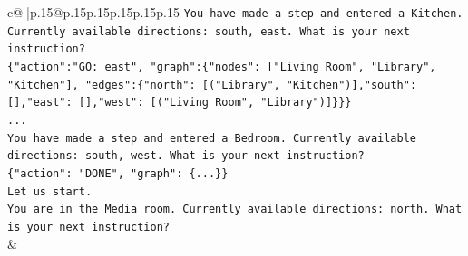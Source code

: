 \documentclass{article}
\begin{document}
{\begin{supertabular}{c@{$\;$}|p{.15\linewidth}@{}p{.15\linewidth}p{.15\linewidth}p{.15\linewidth}p{.15\linewidth}p{.15\linewidth}}
{{{\texttt{You have made a step and entered a Kitchen. Currently available directions: south, east. What is your next instruction?} \\
\texttt{\{"action":"GO: east", "graph":\{"nodes": {[}"Living Room", "Library", "Kitchen"{]}, "edges":\{"north": {[}("Library", "Kitchen"){]},"south": {[}{]},"east": {[}{]},"west": {[}("Living Room", "Library"){]}\}\}\}} \\
\texttt{...} \\
\texttt{You have made a step and entered a Bedroom. Currently available directions: south, west. What is your next instruction?} \\
\texttt{\{"action": "DONE", "graph": \{...\}\}} \\
\texttt{Let us start.} \\
\texttt{You are in the Media room. Currently available directions: north. What is your next instruction?} \\
            }
        }
    }
    & \\ \\


\end{supertabular}}
\end{document}
